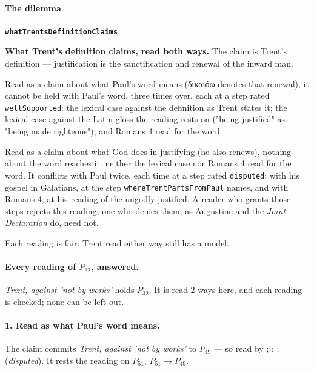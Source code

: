 \documentclass[11pt]{article}
\begin{document}
\paragraph*{The dilemma}
\leavevmode\par
\par\medskip\noindent\textbf{\texttt{what\allowbreak{}Trents\allowbreak{}Definition\allowbreak{}Claims}}\par\nobreak\noindent
\textbf{What Trent's definition claims, read both ways.} The claim is Trent's definition — justification is the sanctification and renewal of the inward man.

Read as a claim about what Paul's word means (δικαιόω denotes that renewal), it cannot be held with Paul's word, three times over, each at a step rated \texttt{well\allowbreak{}Supported}: the lexical case against the definition as Trent states it; the lexical case against the Latin gloss the reading rests on ("being justified" as "being made righteous"); and Romans 4 read for the word.

Read as a claim about what God does in justifying (he also renews), nothing about the word reaches it: neither the lexical case nor Romans 4 read for the word. It conflicts with Paul twice, each time at a step rated \texttt{disputed}: with his gospel in Galatians, at the step \texttt{where\allowbreak{}Trent\allowbreak{}Parts\allowbreak{}From\allowbreak{}Paul} names, and with Romans 4, at his reading of the ungodly justified. A reader who grants those steps rejects this reading; one who denies them, as Augustine and the \emph{Joint Declaration} do, need not.

Each reading is fair: Trent read either way still has a model.

\paragraph{Every reading of \(P_{32}\), answered.} \emph{Trent, against 'not by works'} holds \(P_{32}\). It is read 2 ways here, and each reading is checked; none can be left out.

\paragraph{1. Read as what Paul's word means.} The claim commits \emph{Trent, against 'not by works'} to \(P_{49}\) --- so read by \cite[Trent, Session VI (1547), Decree on Justification, ch. 8]{tanner-decrees-1990}; \cite[Trent, Session VI (1547), Decree on Justification, ch. 7]{tanner-decrees-1990}; \cite[On the Spirit and the Letter, ch. 45 (26.45)]{npnf1-05-1887}; \cite{mcgrath-iustitia-dei-2005} (\emph{disputed}). It rests the reading on \(P_{51}\), \(P_{51} \rightarrow P_{49}\).
\end{document}
